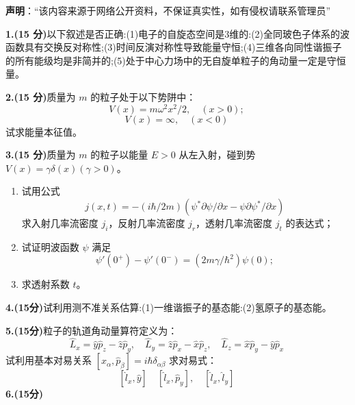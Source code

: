 
\textbf{声明}：“该内容来源于网络公开资料，不保证真实性，如有侵权请联系管理员”

\textbf{1.(15 分)}以下叙述是否正确:(1)电子的自旋态空间是3维的:(2)全同玻色子体系的波函数具有交换反对称性;(3)时间反演对称性导致能量守恒;(4)三维各向同性谐振子的所有能级均是非简并的;(5)处于中心力场中的无自旋单粒子的角动量一定是守恒量。

\textbf{2.(15 分)}质量为 $m$ 的粒子处于以下势阱中：
\[
V(x) = m \omega^2 x^2/2, \quad (x > 0);~
\]
\[
V(x) = \infty, \quad (x < 0)~
\]
试求能量本征值。

\textbf{3.(15 分)}质量为 $m$ 的粒子以能量 $E > 0$ 从左入射，碰到势 $V(x) = \gamma \delta(x) (\gamma > 0)$。

\begin{enumerate}
    \item 试用公式
    \[
    j(x,t) = -(i\hbar/2m)(\psi^* \partial \psi/\partial x - \psi \partial \psi^*/\partial x)~
    \]
    求入射几率流密度 $j_i$，反射几率流密度 $j_r$，透射几率流密度 $j_t$ 的表达式；
    
    \item 试证明波函数 $\psi$ 满足
    \[
    \psi'(0^+) - \psi'(0^-) = (2m\gamma/\hbar^2)\psi(0);~
    \]
    
    \item 求透射系数 $t$。
\end{enumerate}

\textbf{4.(15分)}试利用测不准关系估算:(1)一维谐振子的基态能:(2)氢原子的基态能。


\textbf{5.(15分)}粒子的轨道角动量算符定义为：
\[
\hat{L}_x = \hat{y}\hat{p}_z - \hat{z}\hat{p}_y, \quad \hat{L}_y = \hat{z}\hat{p}_x - \hat{x}\hat{p}_z, \quad \hat{L}_z = \hat{x}\hat{p}_y - \hat{y}\hat{p}_x~
\]
试利用基本对易关系 $[\hat{x}_\alpha, \hat{p}_\beta] = i\hbar \delta_{\alpha\beta}$ 求对易式：
\[
[\hat{l}_x, \hat{y}] \quad [\hat{l}_x, \hat{p}_y],\quad[\hat{l}_x, \hat{l}_y]~
\]
\textbf{6.(15分)}